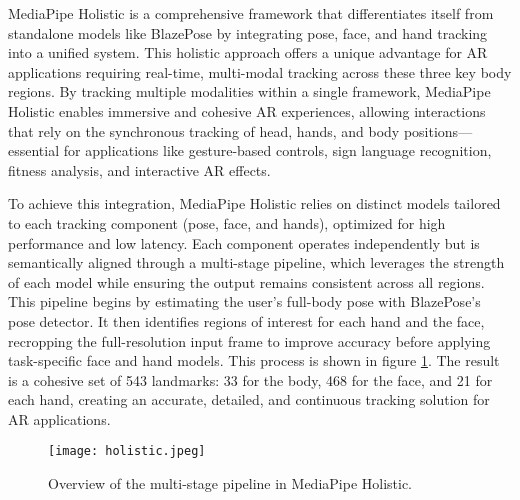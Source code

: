 MediaPipe Holistic is a comprehensive framework that differentiates itself from standalone models like BlazePose by integrating pose, face, and hand tracking into a unified system.
This holistic approach offers a unique advantage for AR applications requiring real-time, multi-modal tracking across these three key body regions.
By tracking multiple modalities within a single framework, MediaPipe Holistic enables immersive and cohesive AR experiences, allowing interactions that rely on the synchronous tracking of head, hands, and body positions—essential for applications like gesture-based controls, sign language recognition, fitness analysis, and interactive AR effects.

To achieve this integration, MediaPipe Holistic relies on distinct models tailored to each tracking component (pose, face, and hands), optimized for high performance and low latency.
Each component operates independently but is semantically aligned through a multi-stage pipeline, which leverages the strength of each model while ensuring the output remains consistent across all regions.
This pipeline begins by estimating the user’s full-body pose with BlazePose’s pose detector.
It then identifies regions of interest for each hand and the face, recropping the full-resolution input frame to improve accuracy before applying task-specific face and hand models.
This process is shown in figure \ref{fig:holisticArchitecture}.
The result is a cohesive set of 543 landmarks: 33 for the body, 468 for the face, and 21 for each hand, creating an accurate, detailed, and continuous tracking solution for AR applications.
\begin{figure}[!h]
    \centering
    \texttt{[image: holistic.jpeg]}
    \caption{Overview of the multi-stage pipeline in MediaPipe Holistic.}
    \vspace{0.1cm}
    \label{fig:holisticArchitecture}
\end{figure}




